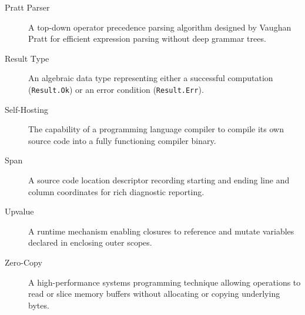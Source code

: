 \begin{description}
    \item[Pratt Parser] A top-down operator precedence parsing algorithm designed by Vaughan Pratt for efficient expression parsing without deep grammar trees.
    \item[Result Type] An algebraic data type representing either a successful computation (\texttt{Result.Ok}) or an error condition (\texttt{Result.Err}).
    \item[Self-Hosting] The capability of a programming language compiler to compile its own source code into a fully functioning compiler binary.
    \item[Span] A source code location descriptor recording starting and ending line and column coordinates for rich diagnostic reporting.
    \item[Upvalue] A runtime mechanism enabling closures to reference and mutate variables declared in enclosing outer scopes.
    \item[Zero-Copy] A high-performance systems programming technique allowing operations to read or slice memory buffers without allocating or copying underlying bytes.
\end{description}
